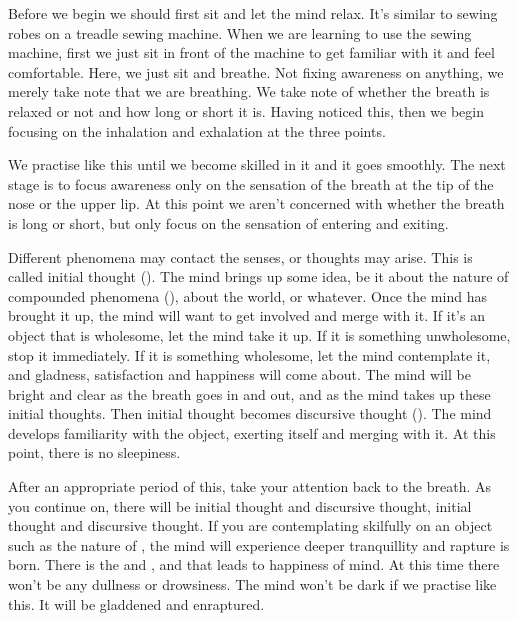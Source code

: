 Before we begin we should first sit and let the mind relax. It's similar to sewing robes on a treadle sewing machine. When we are learning to use the sewing machine, first we just sit in front of the machine to get familiar with it and feel comfortable. Here, we just sit and breathe. Not fixing awareness on anything, we merely take note that we are breathing. We take note of whether the breath is relaxed or not and how long or short it is. Having noticed this, then we begin focusing on the inhalation and exhalation at the three points. 

We practise like this until we become skilled in it and it goes smoothly. The next stage is to focus awareness only on the sensation of the breath at the tip of the nose or the upper lip. At this point we aren't concerned with whether the breath is long or short, but only focus on the sensation of entering and exiting. 

Different phenomena may contact the senses, or thoughts may arise. This is called initial thought (). The mind brings up some idea, be it about the nature of compounded phenomena (), about the world, or whatever. Once the mind has  brought it up, the mind will want to get involved and merge with it. If it's an object that is wholesome, let the mind take it up. If it is something unwholesome, stop it immediately. If it is something wholesome, let the mind contemplate it, and gladness, satisfaction and happiness will come about. The mind will be bright and clear as the breath goes in and out, and as the mind takes up these initial thoughts. Then initial thought becomes discursive thought (). The mind develops familiarity with the object, exerting itself and merging with it. At this point, there is no sleepiness. 

After an appropriate period of this, take your attention back to the breath. As you continue on, there will be initial thought and discursive thought, initial thought and discursive thought. If you are contemplating skilfully on an object such as the nature of , the mind will experience deeper tranquillity and rapture is born. There is the  and , and that leads to happiness of mind. At this time there won't be any dullness or drowsiness. The mind won't be dark if we practise like this. It will be gladdened and enraptured. 

